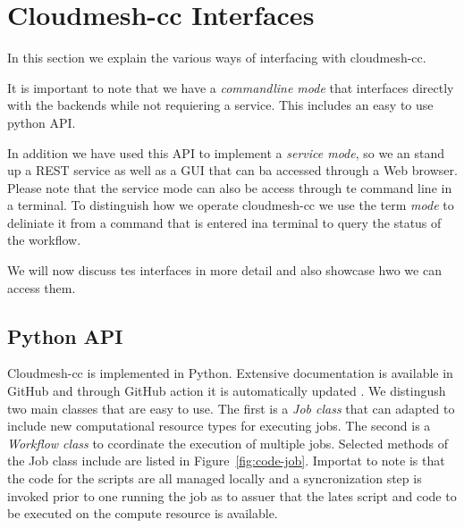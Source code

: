 
\section{Cloudmesh-cc Interfaces}

In this section we explain the various ways of interfacing with cloudmesh-cc.

It is important to note that we have a {\em commandline mode} that interfaces directly with the backends while not requiering a service. This includes an easy to use python API.

In addition we have used this API to implement a {\em service mode}, so we an stand up a REST service as well as a GUI that can ba accessed through a Web browser.
Please note that the service mode can also be access through te command line in a terminal. To distinguish how we operate cloudmesh-cc we use the term {\em mode} to deliniate it from a command that is entered ina terminal to query the status of the workflow.

We will now discuss tes interfaces in more detail and also showcase
hwo we can access them.


\subsection{Python API}

Cloudmesh-cc is implemented in Python. Extensive documentation is
available in GitHub and through GitHub action it is automatically
updated \cite{github-cloudmesh-cc}.  We distingush two main classes
that are easy to use. The first is a {\em Job class} that can adapted
to include new computational resource types for executing jobs. The
second is a {\em Workflow class} to ccordinate the execution of
multiple jobs. Selected methods of the Job class include are listed in
Figure~\ref{fig:code-job}. Importat to note is that the code for the
scripts are all managed locally and a syncronization step is invoked
prior to one running the job as to assuer that the lates script and
code to be executed on the compute resource is available.

